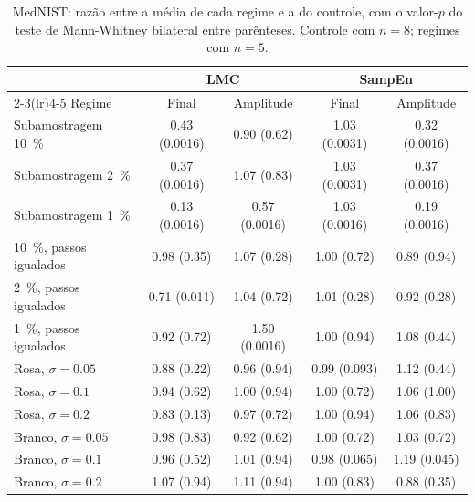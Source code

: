 \begin{table}[H]
  \centering
  \caption{MedNIST: razão entre a média de cada regime e a do controle, com o
  valor-$p$ do teste de Mann-Whitney bilateral entre parênteses. Controle com
  $n = 8$; regimes com $n = 5$.}
  \label{tab:comp-mednist}
  \footnotesize
  \begin{tabular}{lcccc}
    \toprule
    & \multicolumn{2}{c}{LMC} & \multicolumn{2}{c}{SampEn} \\
    \cmidrule(lr){2-3}\cmidrule(lr){4-5}
    Regime & Final & Amplitude & Final & Amplitude \\
    \midrule
    Subamostragem \SI{10}{\percent} & \num{0,43} (\num{0,0016}) & \num{0,90} (\num{0,62}) & \num{1,03} (\num{0,0031}) & \num{0,32} (\num{0,0016}) \\
    Subamostragem \SI{2}{\percent}  & \num{0,37} (\num{0,0016}) & \num{1,07} (\num{0,83}) & \num{1,03} (\num{0,0031}) & \num{0,37} (\num{0,0016}) \\
    Subamostragem \SI{1}{\percent}  & \num{0,13} (\num{0,0016}) & \num{0,57} (\num{0,0016}) & \num{1,03} (\num{0,0016}) & \num{0,19} (\num{0,0016}) \\
    \midrule
    \SI{10}{\percent}, passos igualados & \num{0,98} (\num{0,35}) & \num{1,07} (\num{0,28}) & \num{1,00} (\num{0,72}) & \num{0,89} (\num{0,94}) \\
    \SI{2}{\percent}, passos igualados  & \num{0,71} (\num{0,011}) & \num{1,04} (\num{0,72}) & \num{1,01} (\num{0,28}) & \num{0,92} (\num{0,28}) \\
    \SI{1}{\percent}, passos igualados  & \num{0,92} (\num{0,72}) & \num{1,50} (\num{0,0016}) & \num{1,00} (\num{0,94}) & \num{1,08} (\num{0,44}) \\
    \midrule
    Rosa, $\sigma = \num{0,05}$   & \num{0,88} (\num{0,22}) & \num{0,96} (\num{0,94}) & \num{0,99} (\num{0,093}) & \num{1,12} (\num{0,44}) \\
    Rosa, $\sigma = \num{0,1}$    & \num{0,94} (\num{0,62}) & \num{1,00} (\num{0,94}) & \num{1,00} (\num{0,72}) & \num{1,06} (\num{1,00}) \\
    Rosa, $\sigma = \num{0,2}$    & \num{0,83} (\num{0,13}) & \num{0,97} (\num{0,72}) & \num{1,00} (\num{0,94}) & \num{1,06} (\num{0,83}) \\
    Branco, $\sigma = \num{0,05}$ & \num{0,98} (\num{0,83}) & \num{0,92} (\num{0,62}) & \num{1,00} (\num{0,72}) & \num{1,03} (\num{0,72}) \\
    Branco, $\sigma = \num{0,1}$  & \num{0,96} (\num{0,52}) & \num{1,01} (\num{0,94}) & \num{0,98} (\num{0,065}) & \num{1,19} (\num{0,045}) \\
    Branco, $\sigma = \num{0,2}$  & \num{1,07} (\num{0,94}) & \num{1,11} (\num{0,94}) & \num{1,00} (\num{0,83}) & \num{0,88} (\num{0,35}) \\
    \bottomrule
  \end{tabular}
\end{table}

